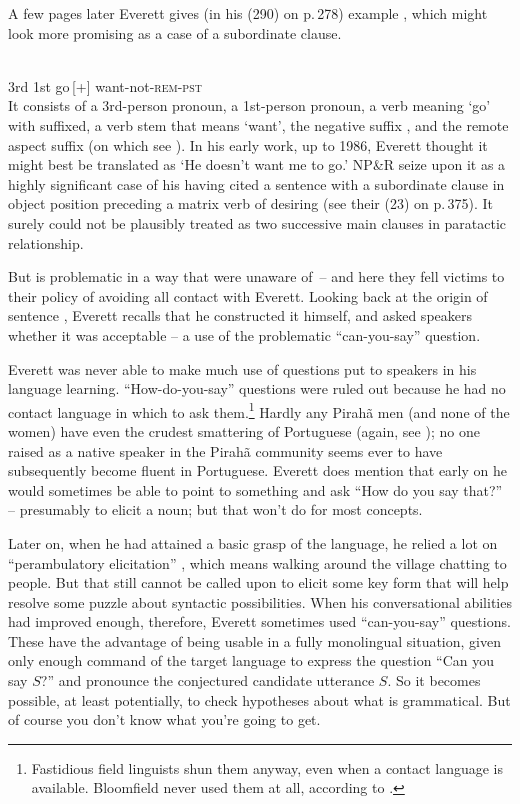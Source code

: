 \documentclass[output=paper,colorlinks,citecolor=brown
]{langscibook}
\begin{document}
A few pages later Everett gives (in his (290) on p.\,278) example ,
which might look more promising as a case of a subordinate clause.

\ea\label{ex:pullum:3}
\gll {}    
            \\
         3rd 1st go\,[+] want-not-\textsc{rem-pst}\\
\z
\noindent
It consists of a 3rd-person pronoun, a 1st-person pronoun, a
verb meaning `go' with \mbox{} suffixed, a verb stem that
means `want', the negative suffix , and the remote aspect
suffix  (on which see \citealt[293--294]{Everett86HAL}). In
his early work, up to 1986, Everett thought it might best be translated
as `He doesn't want me to go.' NP\&R seize upon it as a highly significant
case of his having cited a sentence with a subordinate clause in
object position preceding a matrix verb of desiring (see their (23)
on p.\,375). It surely could not be plausibly treated as two successive
main clauses in paratactic relationship.

But  is problematic in a way that \citet{nevins2009evidence} were unaware
of~-- and here they fell victims to their policy of avoiding all contact
with Everett. Looking back at the origin of sentence , Everett recalls
that he constructed it himself, and asked speakers whether it was
acceptable -- a use of the problematic ``can-you-say'' question.

Everett was never able to make much use of questions put to speakers
in his language learning.  ``How-do-you-say'' questions \parencites[114, Ch~6]{Samarin67}[{\textsection}6.4]{SakeEver12} were ruled out because he had no contact language in
which to ask them.\footnote{%
   Fastidious field linguists shun them anyway, even when a contact language
   is available. Bloomfield never used them at all, according to
   .}
Hardly any Pirahã men (and none of the women) have even the crudest
smattering of Portuguese (again, see \citealt{Sakel12}); no one raised
as a native speaker in the Pirahã community seems ever to have
subsequently become fluent in Portuguese. Everett does mention that
early on he would sometimes be able to point to something and ask
``How do you say that?'' \citep[20]{Everett08} -- presumably
to elicit a noun; but that won't do for most concepts.

Later on, when he had attained a basic grasp of the language, he relied
a lot on ``perambulatory elicitation'' \citep[200]{Everett86HAL}, which
means walking around the village chatting to people. But that still
cannot be called upon to elicit some key form that will help resolve
some puzzle about syntactic possibilities. When his conversational
abilities had improved enough, therefore, Everett sometimes used
``can-you-say'' questions. These have the advantage of being usable in
a fully monolingual situation, given only enough command of the target
language to express the question ``Can you say $S$?'' and pronounce the
conjectured candidate utterance $S$. So it becomes possible, at least
potentially, to check hypotheses about what is grammatical. But of
course you don't know what you're going to get.
\end{document}
